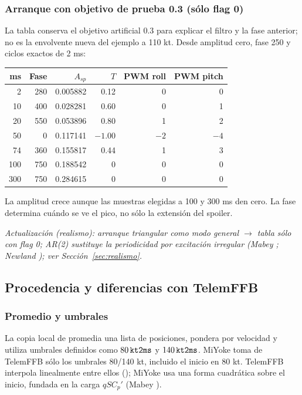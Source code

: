 \subsubsection{Arranque con objetivo de prueba 0.3 (sólo flag 0)}
La tabla conserva el objetivo artificial 0.3 para explicar el filtro y la fase anterior; no es la envolvente nueva del ejemplo a 110 kt.
Desde amplitud cero, fase 250 y ciclos exactos de 2 ms:
\begin{center}\begin{tabular}{rrrrrr}
\toprule ms&Fase&$A_{sp}$&$T$&PWM roll&PWM pitch\\\midrule
2&280&0.005882&0.12&0&0\\10&400&0.028281&0.60&0&1\\20&550&0.053896&0.80&1&2\\50&0&0.117141&$-1.00$&$-2$&$-4$\\74&360&0.155817&0.44&1&3\\100&750&0.188542&0&0&0\\300&750&0.284615&0&0&0\\\bottomrule
\end{tabular}\end{center}
La amplitud crece aunque las muestras elegidas a 100 y 300 ms den cero. La fase determina cuándo se ve el pico, no sólo la extensión del spoiler.

\textit{Actualización (realismo): arranque triangular como modo general $\rightarrow$ tabla sólo con flag 0; AR(2) sustituye la periodicidad por excitación irregular (Mabey \cite{mabey1988}; Newland \cite{newland1993}); ver Sección~\ref{sec:realismo}.}

\subsection{Procedencia y diferencias con TelemFFB}
\subsubsection{Promedio y umbrales}
La copia local de  promedia una lista de posiciones, pondera por velocidad y utiliza umbrales definidos como $80\,\code{kt2ms}$ y $140\,\code{kt2ms}$. %
MiYoke toma de TelemFFB sólo los umbrales 80/140 kt, incluido el inicio en 80 kt. TelemFFB interpola linealmente entre ellos (); MiYoke usa una forma cuadrática sobre el inicio, fundada en la carga $qSC_p'$ (Mabey \cite{mabey1988}).

